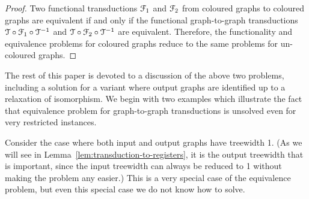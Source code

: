 \begin{proof}
    Two functional \mso transductions ${\mathcal F}_1$ and ${\mathcal F}_2$  from coloured graphs to coloured graphs are equivalent if and only if the functional graph-to-graph \mso transductions  ${\mathcal T} \circ {\mathcal F}_1 \circ {\mathcal T}^{-1}$ and ${\mathcal T} \circ {\mathcal F}_2 \circ {\mathcal T}^{-1}$ are equivalent. 
     Therefore, the functionality and equivalence problems for coloured graphs reduce to the same problems for un-coloured graphs.
\end{proof}

The rest of this paper is devoted to a discussion of the above two problems, including a solution for a variant where output graphs are identified up to a relaxation of isomorphism.
We begin with two examples which illustrate the fact that equivalence problem for graph-to-graph transductions is unsolved even for very restricted instances.

    Consider the
    case
    where both input and output graphs have treewidth 1. (As we will see in Lemma~\ref{lem:transduction-to-registers}, it is the output treewidth that is important, since the input treewidth can always be reduced to 1 without making the problem any easier.) This is a very special case of the equivalence problem, but even this special case we do not know how to solve.
    
